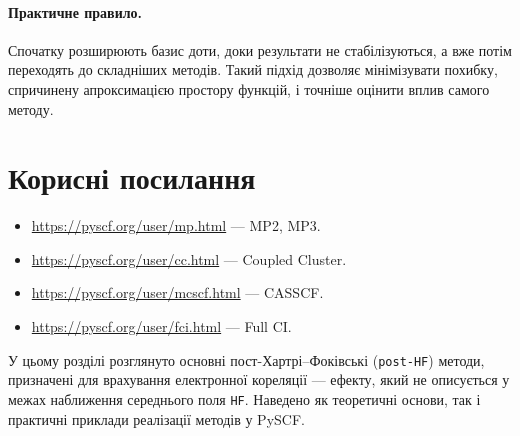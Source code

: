 \paragraph{Практичне правило.}
Спочатку розширюють базис доти, доки результати не стабілізуються,
а вже потім переходять до складніших методів.
Такий підхід дозволяє мінімізувати похибку, спричинену апроксимацією простору функцій,
і точніше оцінити вплив самого методу.


\section{Корисні посилання}

\begin{itemize}
    \item \url{https://pyscf.org/user/mp.html} --- MP2, MP3.
    \item \url{https://pyscf.org/user/cc.html} --- Coupled Cluster.
    \item \url{https://pyscf.org/user/mcscf.html} --- CASSCF.
    \item \url{https://pyscf.org/user/fci.html} --- Full CI.
\end{itemize}


У цьому розділі розглянуто основні пост-Хартрі--Фоківські (\texttt{post-HF}) методи,
призначені для врахування електронної кореляції --- ефекту, який не описується у межах наближення середнього поля \texttt{HF}.
Наведено як теоретичні основи, так і практичні приклади реалізації методів у PySCF.

